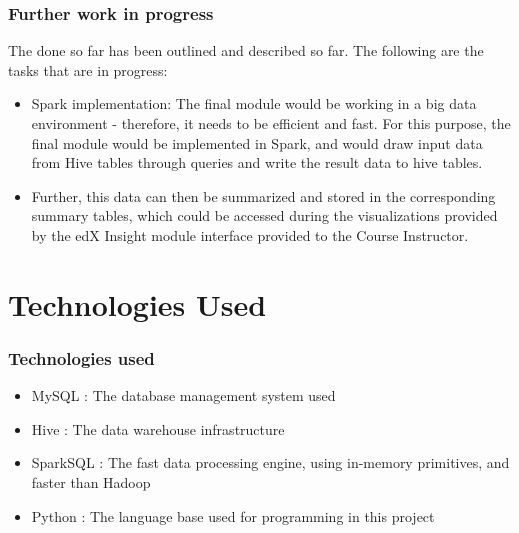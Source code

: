 \documentclass[12pt,xcolor=dvipsnames]{beamer}
\begin{document}
\begin{frame}[t]
\frametitle{Further work in progress}

The done so far has been outlined and described so far. The following are the tasks that are in progress:

\begin{itemize}
\item Spark implementation: The final module would be working in a big data environment - therefore, it needs to be efficient and fast. For this purpose, the final module would be implemented in Spark, and would draw input data from Hive tables through queries and write the result data to hive tables.

\item Further, this data can then be summarized and stored in the corresponding summary tables, which could be accessed during the visualizations provided by the edX Insight module interface provided to the Course Instructor.

\end{itemize}

\end{frame}


\section{Technologies Used}
\begin{frame}[t]
\frametitle{Technologies used}

\begin{itemize}

\item MySQL		:	The database management system used

\item Hive		:	The data warehouse infrastructure

\item SparkSQL	:	The fast data processing engine, using in-memory primitives, and faster than Hadoop

\item Python		:	The language base used for programming in this project

\end{itemize}
\end{frame}

\end{document}
